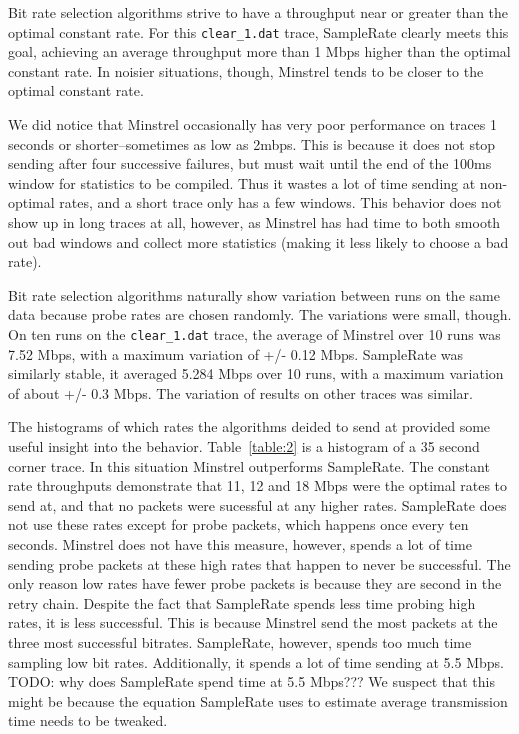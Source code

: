 \documentclass[letterpaper,twocolumn,10pt]{article}
\begin{document}
Bit rate selection algorithms strive to have a throughput near or greater than the optimal constant rate. For this \texttt{clear\_1.dat} trace, SampleRate clearly meets this goal, achieving an average throughput more than 1 Mbps higher than the optimal constant rate. In noisier situations, though, Minstrel tends to be closer to the optimal constant rate. 

We did notice that Minstrel occasionally has very poor performance on traces 1 seconds or shorter--sometimes as low as 2mbps. This is because it does not stop sending after four successive failures, but must wait until the end of the 100ms window for statistics to be compiled. Thus it wastes a lot of time sending at non-optimal rates, and a short trace only has a few windows. This behavior does not show up in long traces at all, however, as Minstrel has had time to both smooth out bad windows and collect more statistics (making it less likely to choose a bad rate).


Bit rate selection algorithms naturally show variation between runs on the same data because probe rates are chosen randomly. The variations were small, though. On ten runs on the \texttt{clear\_1.dat} trace, the average of Minstrel over 10 runs was 7.52 Mbps, with a maximum variation of +/- 0.12 Mbps. SampleRate was similarly stable, it averaged 5.284 Mbps over 10 runs, with a maximum variation of about +/- 0.3 Mbps. The variation of results on other traces was similar.

The histograms of which rates the algorithms deided to send at provided some useful insight into the behavior. Table~\ref{table:2} is a histogram of a 35 second corner trace. In this situation Minstrel outperforms SampleRate. The constant rate throughputs demonstrate that 11, 12 and 18 Mbps were the optimal rates to send at, and that no packets were sucessful at any higher rates. SampleRate does not use these rates except for probe packets, which happens once every ten seconds. Minstrel does not have this measure, however, spends a lot of time sending probe packets at these high rates that happen to never be successful. The only reason low rates have fewer probe packets is because they are second in the retry chain. Despite the fact that SampleRate spends less time probing high rates, it is less successful. This is because Minstrel send the most packets at the three most successful bitrates. SampleRate, however, spends too much time sampling low bit rates. Additionally, it spends a lot of time sending at 5.5 Mbps. TODO: why does SampleRate spend time at 5.5 Mbps??? We suspect that this might be because the equation SampleRate uses to estimate average transmission time needs to be tweaked. 
\end{document}
